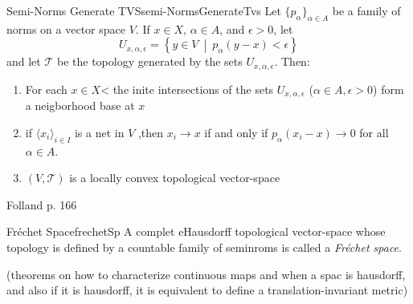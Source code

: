 \documentclass[oneside]{book}
\newcommand{\CT}{\mathcal{T}}
\newcommand{\EH}{\EuScript{H}}
\newcommand{\sse}{\subseteq}
\newcommand{\rw}{\rightarrow}
\newcommand{\set}[2]{\left\{#1 \ \middle|\ #2\right\}}
\begin{document}
\begin{thm}{Semi-Norms Generate TVS}{semi-NormsGenerateTvs}
	Let $\{p_\alpha\}_{\alpha \in A}$ be a family of norms on a vector space $V$. If $x \in X$, $\alpha \in A$, and
	$\epsilon > 0$, let
	\[
		U_{x,\alpha,\epsilon} = \set{y \in V}{p_{\alpha}(y-x) < \epsilon}
	\]
	and let $\CT$ be the topology generated by the sets $U_{x,\alpha,\epsilon}$. Then:
	\begin{enumerate}
		\item For each $x \in X$< the inite intersections of the sets $U_{x, \alpha, \epsilon}$ ($\alpha \in A, \epsilon
			> 0$) form a neigborhood base at $x$
		\item if $\langle x_i\rangle_{i \in I}$ is a net in $V$ ,then $x_i \rw x$ if and only if $p_{\alpha}(x_i - x)
			\rw 0$ for all $ \alpha \in A$.
		\item $(V, \CT)$ is a locally convex topological vector-space
	\end{enumerate}
\end{thm}

\begin{Proof}
	Folland p. 166
\end{Proof}

\begin{defn}{Fr\'echet Space}{frechetSp}
	A complet eHausdorff topological vector-space whose topology is defined by a countable family of seminroms is called
	a \emph{Fr\'echet space}.
\end{defn}

(theorems on how to characterize continuous maps and when a spac is hausdorff, and also if it is hausdorff, it is
equivalent to define a translation-invariant metric)





\end{document}
